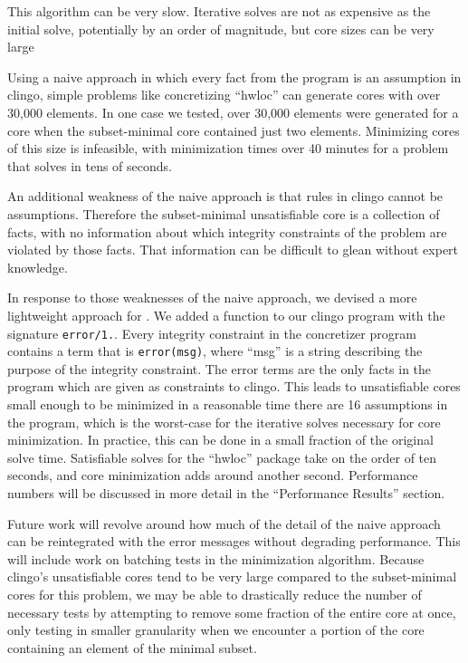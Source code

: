 This algorithm can be very slow.
Iterative solves are not as expensive as the initial solve, potentially by an order of magnitude, but core sizes can be very large

Using a naive approach in which every fact from the program is an assumption in clingo, simple \spack{} problems like concretizing ``hwloc'' can generate cores with over 30,000 elements.
In one case we tested, over 30,000 elements were generated for a core when the subset-minimal core contained just two elements.
Minimizing cores of this size is infeasible, with minimization times over 40 minutes for a problem that solves in tens of seconds.

An additional weakness of the naive approach is that rules in clingo cannot be assumptions.
Therefore the subset-minimal unsatisfiable core is a collection of facts, with no information about which integrity constraints of the problem are violated by those facts.
That information can be difficult to glean without expert knowledge.

In response to those weaknesses of the naive approach, we devised a more lightweight approach for \spack.
We added a function to our clingo program with the signature \texttt{error/1.}.
Every integrity constraint in the concretizer program contains a term that is \texttt{error(msg)}, where ``msg'' is a string describing the purpose of the integrity constraint.
The error terms are the only facts in the program which are given as constraints to clingo.
This leads to unsatisfiable cores small enough to be minimized in a reasonable time \textemdash there are 16 assumptions in the program, which is the worst-case for the iterative solves necessary for core minimization.
In practice, this can be done in a small fraction of the original solve time.
Satisfiable solves for the ``hwloc'' package take on the order of ten seconds, and core minimization adds around another second.
Performance numbers will be discussed in more detail in the ``Performance Results'' section.

Future work will revolve around how much of the detail of the naive approach can be reintegrated with the error messages without degrading performance.
This will include work on batching tests in the minimization algorithm.
Because clingo's unsatisfiable cores tend to be very large compared to the subset-minimal cores for this problem, we may be able to drastically reduce the number of necessary tests by attempting to remove some fraction of the entire core at once, only testing in smaller granularity when we encounter a portion of the core containing an element of the minimal subset.
